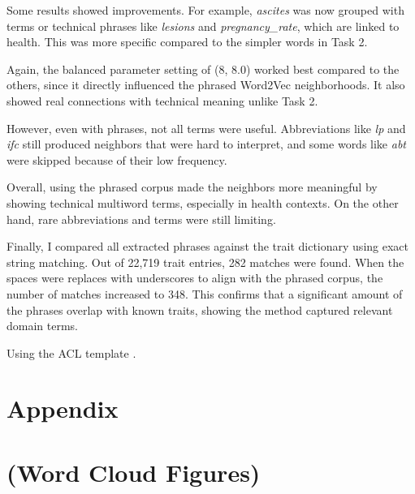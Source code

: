 \documentclass[11pt]{article}
\begin{document}
Some results showed improvements. For example, \textit{ascites} was now grouped with terms or technical 
phrases like \textit{lesions} and \textit{pregnancy\_rate}, which are linked to health. 
This was more specific compared to the simpler words in Task 2.  

 Again, the balanced parameter setting of (8, 8.0) worked best compared to the others, since it directly 
 influenced the phrased Word2Vec neighborhoods. It also showed real connections with technical meaning unlike Task 2.  

However, even with phrases, not all terms were useful. Abbreviations like \textit{lp} and \textit{ifc} still 
produced neighbors that were hard to interpret, and some words like \textit{abt} were skipped because 
of their low frequency.  

Overall, using the phrased corpus made the neighbors more meaningful by showing technical multiword terms, 
especially in health contexts. On the other hand, rare abbreviations and terms were still limiting.  

Finally, I compared all extracted phrases against the trait dictionary using exact string matching. 
Out of 22,719 trait entries, 282 matches were found. When the spaces were replaces with underscores 
to align with the phrased corpus, the number of matches increased to 348. This confirms that a significant 
amount of the phrases overlap with known traits, showing the method captured relevant domain terms.

\vspace*{1em}

Using the ACL template \citep{aclstylefiles}.

\vspace*{1em}



\vspace*{1em}

\appendix
\section*{Appendix}

\section{ (Word Cloud Figures)}
\end{document}
